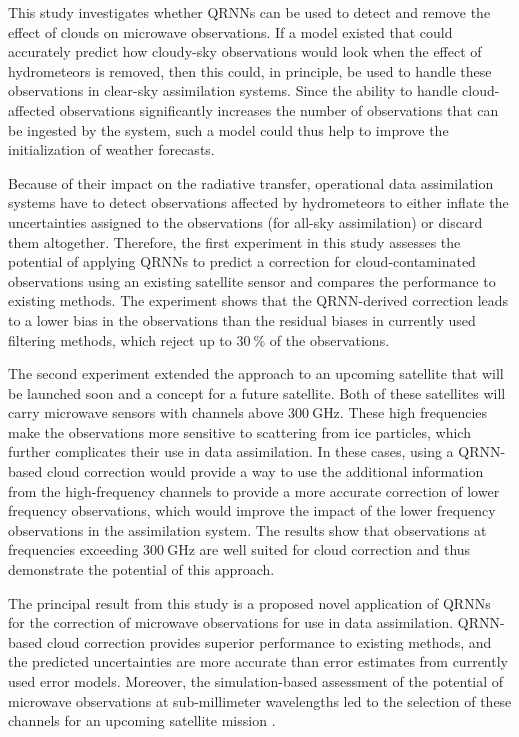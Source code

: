 This study investigates whether QRNNs can be used to detect and remove the
effect of clouds on microwave observations. If a model existed that could
accurately predict how cloudy-sky observations would look when the effect of
hydrometeors is removed, then this could, in principle, be used to handle these
observations in clear-sky assimilation systems. Since the ability to handle
cloud-affected observations significantly increases the number of observations
that can be ingested by the system, such a model could thus help to improve the
initialization of weather forecasts.

Because of their impact on the radiative transfer, operational data assimilation
systems have to detect observations affected by hydrometeors to either inflate
the uncertainties assigned to the observations (for all-sky assimilation) or
discard them altogether. Therefore, the first experiment in this study  assesses
the potential of applying QRNNs to predict a correction for cloud-contaminated
observations using an existing satellite sensor and compares the performance to
existing methods. The experiment shows that the QRNN-derived correction leads to
a lower bias in the observations than the residual biases in currently used
filtering methods, which reject up to $\SI{30}{\percent}$ of the observations.

The second experiment extended the approach to an upcoming satellite that will
be launched soon and a concept for a future satellite. Both of these satellites
will carry microwave sensors with channels above $\SI{300}{\giga \hertz}$. These
high frequencies make the observations more sensitive to scattering from ice
particles, which further complicates their use in data assimilation. In these
cases, using a QRNN-based cloud correction would provide a way to use the
additional information from the high-frequency channels to provide a more
accurate correction of lower frequency observations, which would improve the
impact of the lower frequency observations in the assimilation system. The
results show that observations at frequencies exceeding $\SI{300}{\giga \hertz}$
are well suited for cloud correction and thus demonstrate the potential of this
approach.

The principal result from this study is a proposed novel application of QRNNs
for the correction of microwave observations for use in data assimilation.
QRNN-based cloud correction provides superior performance to existing methods,
and the predicted uncertainties are more accurate than error estimates from
currently used error models. Moreover, the simulation-based assessment of the
potential of microwave observations at sub-millimeter wavelengths led to the
selection of these channels for an upcoming satellite mission
\citep{arctic_weather_satellite}.

